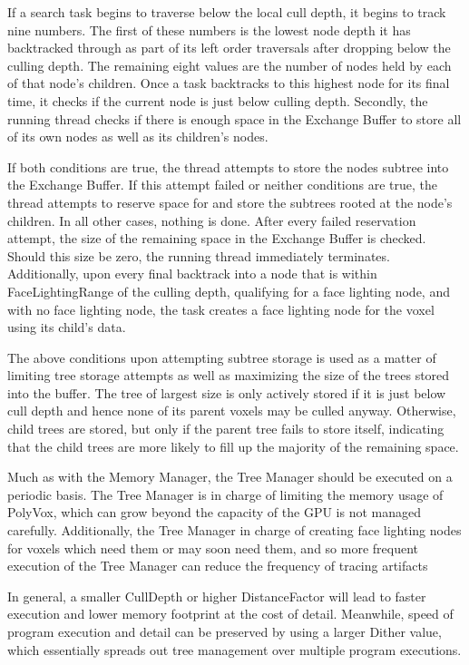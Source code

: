 \documentclass[onecolumn, draftclsnofoot,10pt, compsoc]{IEEEtran}
\newcounter{threesection}[subsubsection]
\begin{document}
If a search task begins to traverse below the local cull depth, it begins to track nine numbers. The first of these numbers is the lowest node depth it has backtracked through as part of its left order traversals after dropping below the culling depth. The remaining eight values are the number of nodes held by each of that node’s children. Once a task backtracks to this highest node for its final time, it checks if the current node is just below culling depth. Secondly, the running thread checks if there is enough space in the Exchange Buffer to store all of its own nodes as well as its children’s nodes.

If both conditions are true, the thread attempts to store the nodes subtree into the Exchange Buffer. If this attempt failed or neither conditions are true, the thread attempts to reserve space for and store the subtrees rooted at the node’s children. In all other cases, nothing is done.
After every failed reservation attempt, the size of the remaining space in the Exchange Buffer is checked. Should this size be zero, the running thread immediately terminates. Additionally, upon every final backtrack into a node that is within FaceLightingRange of the culling depth, qualifying for a face lighting node, and with no face lighting node, the task creates a face lighting node for the voxel using its child’s data. 

The above conditions upon attempting subtree storage is used as a matter of limiting tree storage attempts as well as maximizing the size of the trees stored into the buffer. The tree of largest size is only actively stored if it is just below cull depth and hence none of its parent voxels may be culled anyway. Otherwise, child trees are stored, but only if the parent tree fails to store itself, indicating that the child trees are more likely to fill up the majority of the remaining space.


Much as with the Memory Manager, the Tree Manager should be executed on a periodic basis. The Tree Manager is in charge of limiting the memory usage of PolyVox, which can grow beyond the capacity of the GPU is not managed carefully. Additionally, the Tree Manager in charge of creating face lighting nodes for voxels which need them or may soon need them, and so more frequent execution of the Tree Manager can reduce the frequency of tracing artifacts

 In general, a smaller CullDepth or higher DistanceFactor will lead to faster execution and lower memory footprint at the cost of detail. Meanwhile, speed of program execution and detail can be preserved by using a larger Dither value, which essentially spreads out tree management over multiple program executions.
\end{document}
